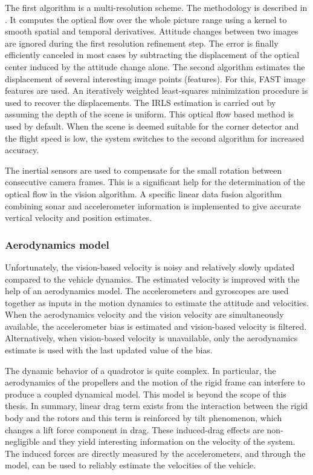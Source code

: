 The first algorithm is a multi-resolution scheme.
The methodology is described in \cite{lukas1981iterative}.
It computes the optical flow over the whole picture range using a kernel to smooth spatial and temporal derivatives.
Attitude changes between two images are ignored during the first resolution refinement step.
The error is finally efficiently canceled in most cases by subtracting the displacement of the optical center induced by the attitude change alone.
The second algorithm estimates the displacement of several interesting image points (features).
For this, FAST image features \cite{rosten2010faster} are used.
An iteratively weighted least-squares minimization procedure is used to recover the displacements.
The IRLS estimation \cite{michaelsen2004pose} is carried out by assuming the depth of the scene is uniform.
This optical flow based method is used by default.
When the scene is deemed suitable for the corner detector and the flight speed is low, the system switches to the second algorithm for increased accuracy.

The inertial sensors are used to compensate for the small rotation between consecutive camera frames.
This is a significant help for the determination of the optical flow in the vision algorithm.
A specific linear data fusion algorithm combining sonar and accelerometer information is implemented to give accurate vertical velocity and position estimates. %

\subsubsection{Aerodynamics model}
Unfortunately, the vision-based velocity is noisy and relatively slowly updated compared to the vehicle dynamics.
The estimated velocity is improved with the help of an aerodynamics model.
The accelerometers and gyroscopes are used together as inputs in the motion dynamics to estimate the attitude and velocities.
When the aerodynamics velocity and the vision velocity are simultaneously available, the accelerometer bias is estimated and vision-based velocity is filtered.
Alternatively, when vision-based velocity is unavailable, only the aerodynamics estimate is used with the last updated value of the bias.

The dynamic behavior of a quadrotor is quite complex.
In particular, the aerodynamics of the propellers and the motion of the rigid frame can interfere to produce a coupled dynamical model.
This model is beyond the scope of this thesis.
In summary, linear drag term exists from the interaction between the rigid body and the rotors and this term is reinforced by tilt phenomenon, which changes a lift force component in drag.
These induced-drag effects are non-negligible and they yield interesting information on the velocity of the system.
The induced forces are directly measured by the accelerometers, and through the model, can be used to reliably estimate the velocities of the vehicle.

